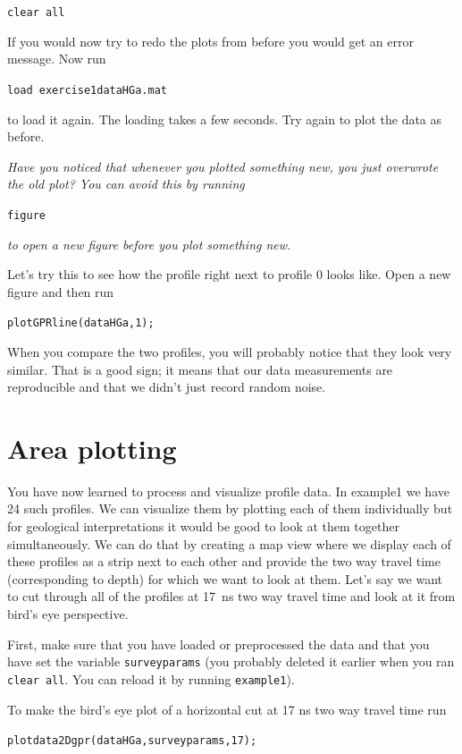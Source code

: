\documentclass[11pt]{article}
\begin{document}
\qquad \verb#clear all#
 
If you would now try to redo the plots from before you would get an
error message. Now run
 
\qquad \verb#load exercise1dataHGa.mat#
 
to load it again.  The loading takes a few seconds. Try again to plot
the data as before.


\emph{Have you noticed that whenever you plotted something new, you
  just overwrote the old plot? You can avoid this by running}

\qquad \verb#figure#

\emph{to open a new figure before you plot something new.}

Let's try this to see how the profile right next to profile 0 looks
like. Open a new figure and then run

\qquad \verb#plotGPRline(dataHGa,1);#
   
When you compare the two profiles, you will probably notice that they look very
similar. That is a good sign; it means that our data measurements are
reproducible and that we didn't just record random noise.
 

\section{Area plotting}

You have now learned to process and visualize profile data. In
example1 we have 24 such profiles. We can visualize them by plotting
each of them individually but for geological interpretations it would
be good to look at them together simultaneously. We can do that by
creating a map view where we display each of these profiles as a strip
next to each other and provide the two way travel time (corresponding
to depth) for which we want to look at them. Let's say we want to cut
through all of the profiles at \SI{17}{\nano s} two way travel time and look at
it from bird's eye perspective.

First, make sure that you have loaded or preprocessed the data and
that you have set the variable \verb#surveyparams# (you probably
deleted it earlier when you ran \verb#clear all#. You can reload it by
running \verb#example1#).

To make the bird's eye plot of a horizontal cut at 17 ns two way
travel time run

\qquad \verb#plotdata2Dgpr(dataHGa,surveyparams,17);#
\end{document}
